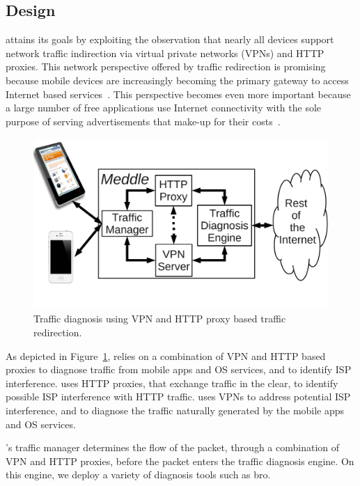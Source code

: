 \subsection{Design}

\meddle attains its goals by exploiting the observation that nearly all devices support network traffic indirection via virtual private networks (VPNs) and HTTP proxies. 
This network perspective offered by traffic redirection is promising because mobile devices are increasingly becoming the primary gateway to access Internet based services~\cite{ict:facts}. 
This perspective becomes even more important because a large number of free applications use Internet connectivity with the sole purpose of serving advertisements that make-up for their costs~\cite{pathak:eprof,vallina-rodriguez:bfc}.

\begin{figure}[h]
\centering
\includegraphics[width=\columnwidth]{figures/Meddle-Design.pdf}
\caption{Traffic diagnosis using VPN and HTTP proxy based traffic redirection.}
\label{fig:architecture}
\end{figure}
As depicted in Figure~\ref{fig:architecture}, \meddle relies on a combination of VPN and HTTP based proxies to diagnose traffic from mobile apps and OS services, and to identify ISP interference.
\meddle uses HTTP proxies, that exchange traffic in the clear, to identify possible ISP interference with HTTP traffic. 
\meddle uses VPNs to address potential ISP interference, and to diagnose the traffic naturally generated by the mobile apps and OS services.

\meddle's traffic manager determines the flow of the packet, through a combination of VPN and HTTP proxies, before the packet enters the traffic diagnosis engine. 
On this engine, we deploy a variety of diagnosis tools such as bro. 



